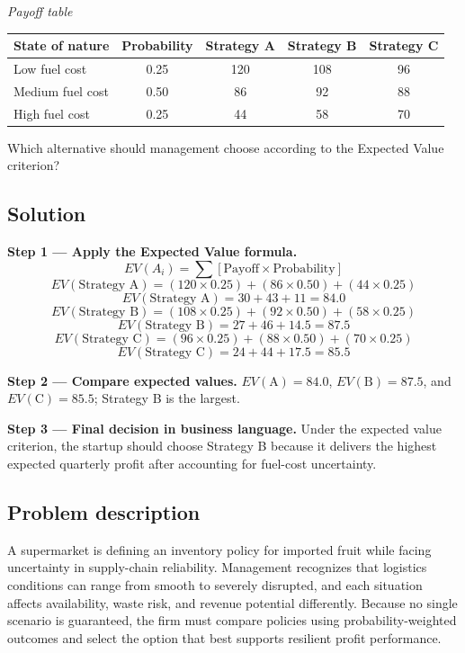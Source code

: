 \begin{ExamProblems}
		\begin{center}
			\textit{Payoff table} \par
			\begin{tabular}{l c c c c}
				\toprule
				State of nature & Probability & Strategy A & Strategy B & Strategy C \\
				\midrule
				Low fuel cost & 0.25 & 120 & 108 & 96 \\
				Medium fuel cost & 0.50 & 86 & 92 & 88 \\
				High fuel cost & 0.25 & 44 & 58 & 70 \\
				\bottomrule
			\end{tabular}
		\end{center}

		Which alternative should management choose according to the Expected Value criterion?

		\subsection*{Solution}
		\textbf{Step 1 --- Apply the Expected Value formula.}
		\[
		EV(A_i)=\sum [\text{Payoff}\times\text{Probability}]
		\]
		\[
		EV(\text{Strategy A})=(120\times0.25)+(86\times0.50)+(44\times0.25)
		\]
		\[
		EV(\text{Strategy A})=30+43+11=84.0
		\]
		\[
		EV(\text{Strategy B})=(108\times0.25)+(92\times0.50)+(58\times0.25)
		\]
		\[
		EV(\text{Strategy B})=27+46+14.5=87.5
		\]
		\[
		EV(\text{Strategy C})=(96\times0.25)+(88\times0.50)+(70\times0.25)
		\]
		\[
		EV(\text{Strategy C})=24+44+17.5=85.5
		\]
		
		\textbf{Step 2 --- Compare expected values.}
		$EV(\text{A})=84.0$, $EV(\text{B})=87.5$, and $EV(\text{C})=85.5$; Strategy B is the largest.
		
		\textbf{Step 3 --- Final decision in business language.}
		Under the expected value criterion, the startup should choose Strategy B because it delivers the highest expected quarterly profit after accounting for fuel-cost uncertainty.		\item
		\subsection*{Problem description}
		A supermarket is defining an inventory policy for imported fruit while facing uncertainty in supply-chain reliability. Management recognizes that logistics conditions can range from smooth to severely disrupted, and each situation affects availability, waste risk, and revenue potential differently. Because no single scenario is guaranteed, the firm must compare policies using probability-weighted outcomes and select the option that best supports resilient profit performance.


\end{ExamProblems}
